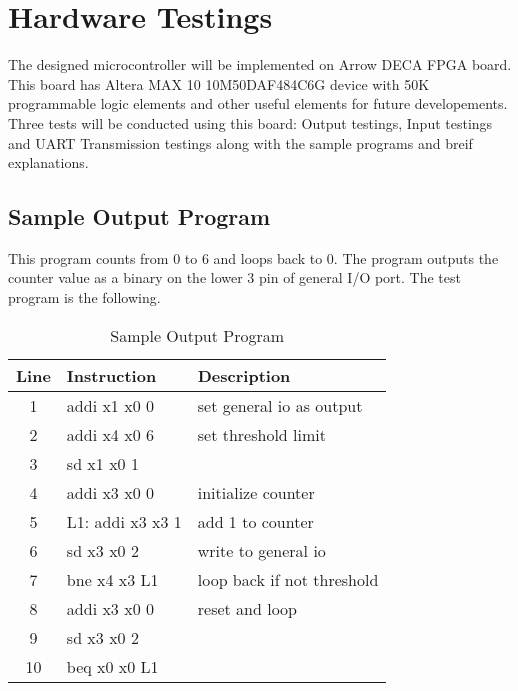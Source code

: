 \chapter{Hardware Testings}
The designed microcontroller will be implemented on Arrow DECA FPGA board.
This board has Altera MAX 10 10M50DAF484C6G device with 50K programmable logic elements and other useful elements for future developements.
Three tests will be conducted using this board: Output testings, Input testings and UART Transmission testings along with the sample programs and breif explanations.

\section{Sample Output Program}
This program counts from 0 to 6 and loops back to 0.
The program outputs the counter value as a binary on the lower 3 pin of general I/O port.
The test program is the following.
\begin{table}[!h]
    \centering
    \caption{Sample Output Program}
    \label{program:sample_output}
    \begin{tabular}{|c|l|l|}
        \hline
        \textbf{Line} & \textbf{Instruction} & \textbf{Description}       \\ \hline
        1             & addi x1 x0 0         & set general io as output   \\ \hline
        2             & addi x4 x0 6         & set threshold limit        \\ \hline
        3             & sd x1 x0 1           &                            \\ \hline
        4             & addi x3 x0 0         & initialize counter         \\ \hline
        5             & L1: addi x3 x3 1     & add 1 to counter           \\ \hline
        6             & sd x3 x0 2           & write to general io        \\ \hline
        7             & bne x4 x3 L1         & loop back if not threshold \\ \hline
        8             & addi x3 x0 0         & reset and loop             \\ \hline
        9             & sd x3 x0 2           &                            \\ \hline
        10            & beq x0 x0 L1         &                            \\ \hline
    \end{tabular}

\end{table}

